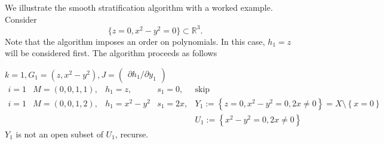 \documentclass[
]{book}
\theoremstyle{definition}
\theoremstyle{definition}
\theoremstyle{definition}
\theoremstyle{definition}
\theoremstyle{remark}
\begin{document}
We illustrate the smooth stratification algorithm with a worked example. Consider
\[
\{ z = 0, x^2-y^2=0 \} \subset \mathbb{R}^3.
\]
Note that the algorithm imposes an order on polynomials. In this case, \(h_1 = z\) will be considered first. The algorithm proceeds as follows

\(k=1,G_{1}=\left(z,x^{2}-y^{2}\right),J=\begin{pmatrix}\partial h_{1}/\partial y_{1}\end{pmatrix}\)
\begin{equation}
\begin{matrix}
i = 1 & M=(0,0,1,1), & h_{1}=z, & s_{1}=0, & \text{skip}\\
i = 1 & M=(0,0,1,2), & h_{1}=x^{2}-y^{2} & s_{1}=2x, & Y_{1}:=\left\{ z=0,x^{2}-y^{2}=0,2x\ne0\right\} =X\setminus\left\{ x=0\right\} \\
&  &  &  & U_{1}:=\left\{ x^{2}-y^{2}=0,2x\ne0\right\} 
\end{matrix}
\end{equation}
\(Y_{1}\) is not an open subset of \(U_{1}\), recurse.
\end{document}

